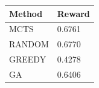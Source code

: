 \begin{tabular}{ll}
\hline
Method & Reward \\
\hline
  MCTS & 0.6761 \\
  RANDOM & 0.6770 \\
  GREEDY & 0.4278 \\
  GA & 0.6406 \\
\hline
\end{tabular}
